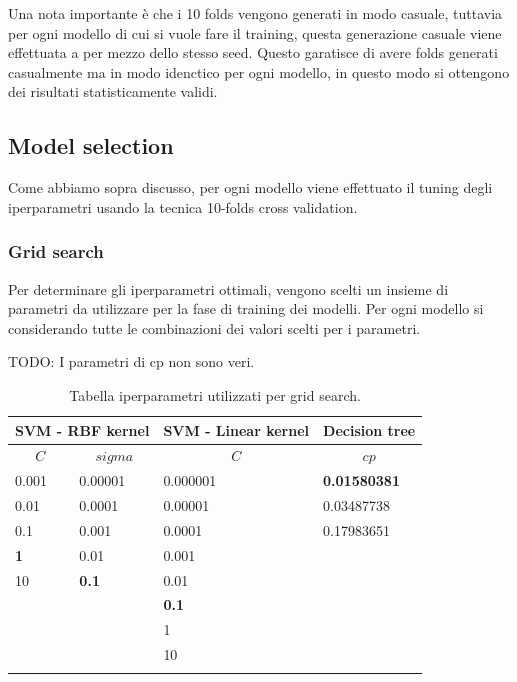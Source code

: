 Una nota importante è che i 10 folds vengono generati in modo casuale, tuttavia per ogni modello di cui si vuole fare il training, questa generazione casuale viene effettuata a per mezzo dello stesso seed. Questo garatisce di avere folds generati casualmente ma in modo idenctico per ogni modello, in questo modo si ottengono dei risultati statisticamente validi.

\subsection{Model selection}
\label{sec:mode_selection}
Come abbiamo sopra discusso, per ogni modello viene effettuato il tuning degli iperparametri usando la tecnica 10-folds cross validation.

\subsubsection{Grid search}
\label{sec:grid-search}
Per determinare gli iperparametri ottimali, vengono scelti un insieme di parametri da utilizzare per la fase di training dei modelli. Per ogni modello si considerando tutte le combinazioni dei valori scelti per i parametri.


TODO: I parametri di cp non sono veri.
\begin{table}[H]
	
	\begin{center}
		
		\begin{tabular}{| l | l | l | l |}
			\hline
			\multicolumn{2}{|c|}{\textbf{SVM -  RBF kernel}} &
			\multicolumn{1}{|c|}{\textbf{SVM - Linear kernel}} &
			\multicolumn{1}{c|}{\textbf{Decision tree}}\\
			\hline
			\hline
			\multicolumn{1}{|c}{$C$} &
			\multicolumn{1}{c|}{$sigma$} &
			\multicolumn{1}{c|}{$C$ } &
			\multicolumn{1}{c|}{$cp$}\\
			\hline
			0.001	 & 0.00001    & 0.000001 & \textbf{0.01580381}\\
			0.01	  & 0.0001      &0.00001	& 0.03487738\\
			0.1	   & 0.001      	&0.0001	   & 0.17983651\\
			\textbf{1}			& 0.01      	  &0.001		  & \\
			10	   &\textbf{ 0.1 }     	  &0.01		   & \\
			&       		   	     &\textbf{0.1}			   & \\
			&       	  			 &1				& \\
			&       	  			 &10			   & \\
				  		   
			\hline
			
			\label{tab:iperp}
		\end{tabular}
		
	\end{center}
	\caption{Tabella iperparametri utilizzati per grid search.}
\end{table}

